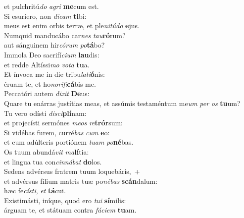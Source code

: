 \evenverse et pulchritú\textit{do} \textit{a}\textit{gri} \textbf{me}cum est.\\
\oddverse Si esuríero, non \textit{di}\textit{cam} \textbf{ti}bi:~\*\\
\oddverse meus est enim orbis terræ, et ple\textit{ni}\textit{tú}\textit{do} \textbf{e}jus.\\
\evenverse Numquid manducábo car\textit{nes} \textit{tau}\textbf{ró}rum?~\*\\
\evenverse aut sánguinem hir\textit{có}\textit{rum} \textit{po}\textbf{tá}bo?\\
\oddverse Immola Deo sacrifí\textit{ci}\textit{um} \textbf{lau}dis:~\*\\
\oddverse et redde Altíssi\textit{mo} \textit{vo}\textit{ta} \textbf{tu}a.\\
\evenverse Et ínvoca me in die tribu\textit{la}\textit{ti}\textbf{ó}nis:~\*\\
\evenverse éruam te, et ho\textit{no}\textit{ri}\textit{fi}\textbf{cá}bis me.\\
\oddverse Peccatóri autem \textit{di}\textit{xit} \textbf{De}us:~\*\\
\oddverse Quare tu enárras justítias meas, et assúmis testaméntum me\textit{um} \textit{per} \textit{os} \textbf{tu}um?\\
\evenverse Tu vero odísti \textit{di}\textit{sci}\textbf{plí}nam:~\*\\
\evenverse et projecísti sermónes \textit{me}\textit{os} \textit{re}\textbf{trór}sum:\\
\oddverse Si vidébas furem, curré\textit{bas} \textit{cum} \textbf{e}o:~\*\\
\oddverse et cum adúlteris portiónem \textit{tu}\textit{am} \textit{po}\textbf{né}bas.\\
\evenverse Os tuum abundá\textit{vit} \textit{ma}\textbf{lí}tia:~\*\\
\evenverse et lingua tua con\textit{cin}\textit{ná}\textit{bat} \textbf{do}los.\\
\oddverse Sedens advérsus fratrem tuum loquebáris,~+\\
\oddverse  et advérsus fílium matris tuæ po\textit{né}\textit{bas} \textbf{scán}dalum:~\*\\
\oddverse hæc fe\textit{cí}\textit{sti}, \textit{et} \textbf{tá}cui.\\
\evenverse Existimásti, iníque, quod ero \textit{tu}\textit{i} \textbf{sí}milis:~\*\\
\evenverse árguam te, et státuam contra \textit{fá}\textit{ci}\textit{em} \textbf{tu}am.\\
